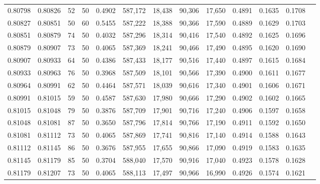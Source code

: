 \begin{tabular}{rrrrrrrrrrrrr}
0.80798 & 0.80826 &    52 &  50 &                                     0.4902 & 587,172 &  18,438 &  90,306 &  17,650 & 0.4891 & 0.1635 & 0.1708 \\
0.80827 & 0.80851 &    50 &  60 &                                     0.5455 & 587,222 &  18,388 &  90,366 &  17,590 & 0.4889 & 0.1629 & 0.1703 \\
0.80851 & 0.80879 &    74 &  50 &                                     0.4032 & 587,296 &  18,314 &  90,416 &  17,540 & 0.4892 & 0.1625 & 0.1696 \\
0.80879 & 0.80907 &    73 &  50 &                                     0.4065 & 587,369 &  18,241 &  90,466 &  17,490 & 0.4895 & 0.1620 & 0.1690 \\
0.80907 & 0.80933 &    64 &  50 &                                     0.4386 & 587,433 &  18,177 &  90,516 &  17,440 & 0.4897 & 0.1615 & 0.1684 \\
0.80933 & 0.80963 &    76 &  50 &                                     0.3968 & 587,509 &  18,101 &  90,566 &  17,390 & 0.4900 & 0.1611 & 0.1677 \\
0.80964 & 0.80991 &    62 &  50 &                                     0.4464 & 587,571 &  18,039 &  90,616 &  17,340 & 0.4901 & 0.1606 & 0.1671 \\
0.80991 & 0.81015 &    59 &  50 &                                     0.4587 & 587,630 &  17,980 &  90,666 &  17,290 & 0.4902 & 0.1602 & 0.1665 \\
0.81015 & 0.81048 &    79 &  50 &                                     0.3876 & 587,709 &  17,901 &  90,716 &  17,240 & 0.4906 & 0.1597 & 0.1658 \\
0.81048 & 0.81081 &    87 &  50 &                                     0.3650 & 587,796 &  17,814 &  90,766 &  17,190 & 0.4911 & 0.1592 & 0.1650 \\
0.81081 & 0.81112 &    73 &  50 &                                     0.4065 & 587,869 &  17,741 &  90,816 &  17,140 & 0.4914 & 0.1588 & 0.1643 \\
0.81112 & 0.81145 &    86 &  50 &                                     0.3676 & 587,955 &  17,655 &  90,866 &  17,090 & 0.4919 & 0.1583 & 0.1635 \\
0.81145 & 0.81179 &    85 &  50 &                                     0.3704 & 588,040 &  17,570 &  90,916 &  17,040 & 0.4923 & 0.1578 & 0.1628 \\
0.81179 & 0.81207 &    73 &  50 &                                     0.4065 & 588,113 &  17,497 &  90,966 &  16,990 & 0.4926 & 0.1574 & 0.1621 \\

\end{tabular}
